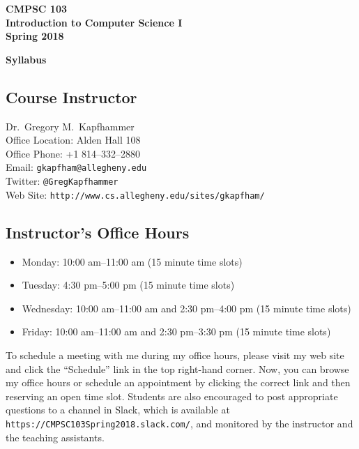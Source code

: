 \documentclass[11pt]{article}
\newcommand{\url}[1]{\lstinline{#1}}
\newcommand{\syllabustitle}[1]
{
  \begin{center}
    \begin{center}
      \bf
      CMPSC 103\\Introduction to Computer Science I\\
      Spring 2018\\
      \medskip
    \end{center}
    \bf
    #1
  \end{center}
}
\begin{document}
\thispagestyle{empty}

\syllabustitle{Syllabus}

\vspace*{-.2in}
\subsection*{Course Instructor}
Dr.\ Gregory M.\ Kapfhammer\\
\noindent Office Location: Alden Hall 108 \\
\noindent Office Phone: +1 814--332--2880 \\
\noindent Email: \url{gkapfham@allegheny.edu} \\
\noindent Twitter: \url{@GregKapfhammer} \\
\noindent Web Site: \url{http://www.cs.allegheny.edu/sites/gkapfham/}

\subsection*{Instructor's Office Hours}

\begin{itemize}
  \itemsep0em

  \item Monday: 10:00 am--11:00 am (15 minute time slots)

  \item Tuesday: 4:30 pm--5:00 pm (15 minute time slots)

  \item Wednesday: 10:00 am--11:00 am and 2:30 pm--4:00 pm (15 minute time slots)

  \item Friday: 10:00 am--11:00 am and 2:30 pm--3:30 pm (15 minute time slots)

\end{itemize}

\vspace*{-.05in}

\noindent To schedule a meeting with me during my office hours, please visit my web site and click the ``Schedule'' link
in the top right-hand corner. Now, you can browse my office hours or schedule an appointment by clicking the correct
link and then reserving an open time slot. Students are also encouraged to post appropriate questions to a channel in
Slack, which is available at \url{https://CMPSC103Spring2018.slack.com/}, and monitored by the instructor and the
teaching assistants.

\vspace*{-.1in}
\end{document}
